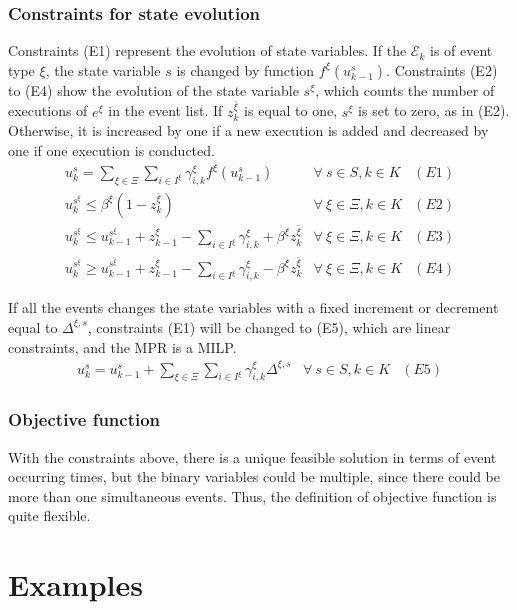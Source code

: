 \documentclass[]{interact}
\theoremstyle{plain}%
\theoremstyle{definition}
\theoremstyle{remark}
\begin{document}
\subsubsection{Constraints  for  state evolution}
Constraints (E1) represent the evolution of state variables. If the $\mathcal{E}_{k}$ is of event type $\xi$, the state variable $s$ is changed by function $f^{\xi}(u^s_{k-1})$. Constraints (E2) to (E4) show the evolution of the state variable $s^{\xi}$, which counts the number of executions of $e^{\xi}$ in the event list. If $z^{\bar{\xi}}_k$ is equal to one, $s^{\xi}$ is set to zero, as in (E2). Otherwise, it is increased by one if a new execution is added and decreased by one if one execution is conducted.
\begin{eqnarray}
u^{s}_{k} =  \sum_{\xi\in \Xi} \sum_{i\in I^{\xi}} \gamma^{\xi}_{i,k} f^{\xi}(u^s_{k-1})& \forall\ s\in S,k\in K&(E1)\nonumber\\
u^{s^{\xi}}_{k}\le \beta^{\xi}(1-z^{\bar{\xi}}_k) & \forall\ \xi\in\Xi,k\in K&(E2)\nonumber\\
u^{s^{\xi}}_{k}\le u^{s^{\xi}}_{k-1} + z^{\xi}_{k-1} - \sum_{i\in I^{\xi}} \gamma^{\xi}_{i,k} + \beta^{\xi}z^{\bar{\xi}}_k& \forall\ \xi\in\Xi,k\in K&(E3)\nonumber\\
u^{s^{\xi}}_{k}\ge u^{s^{\xi}}_{k-1} + z^{\xi}_{k-1} - \sum_{i\in I^{\xi}} \gamma^{\xi}_{i,k} - \beta^{\xi}z^{\bar{\xi}}_k& \forall\ \xi\in\Xi,k\in K&(E4)\nonumber
\end{eqnarray}

If all the events changes the state variables with a fixed increment or decrement equal to $\Delta^{\xi,s}$, constraints (E1) will be changed to (E5), which are linear constraints, and the MPR is a MILP. 
 \begin{eqnarray}
 u^{s}_{k} = u^s_{k-1} + \sum_{\xi\in \Xi} \sum_{i\in I^{\xi}} \gamma^{\xi}_{i,k} \Delta^{\xi,s}& \forall\ s\in S,k\in K&(E5)\nonumber
 \end{eqnarray}
 
\subsubsection{Objective function}
With the constraints above, there is a unique feasible solution in terms of event occurring times, but the binary variables could be multiple, since there could be more than one simultaneous events. Thus, the definition of objective function is quite flexible. 

\section{Examples}
\end{document}
